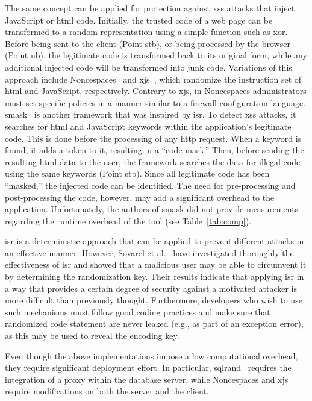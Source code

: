 \documentclass[conference]{IEEEtran}
\begin{document}
The same concept can be applied for protection against
{\sc xss} attacks that inject JavaScript or {\sc html} code.
Initially, the trusted code of a web page can be transformed
to a random representation using a simple function such as {\sc xor}.
Before being sent to the client (Point {\sc s}t{\sc b}),
or being processed by the browser (Point {\sc ub}),
the legitimate code is transformed back to its original form,
while any additional injected code will be transformed into junk code.
Variations of this approach include
Noncespaces~\cite{GC09} and x{\sc js}~\cite{APKLM10}, which
randomize the instruction set of {\sc html} and JavaScript,
respectively. Contrary to x{\sc js}, in Noncespaces administrators
must set specific policies in a manner similar to a firewall
configuration language. {\sc sm}ask~\cite{JB07} is another
framework that was inspired by {\sc isr}. To detect {\sc xss}
attacks, it searches for {\sc html} and
JavaScript keywords within the application's legitimate code. This is
done before the processing of any {\sc http} request. When a keyword is found,
it adds a token to it, resulting in a ``code mask.'' Then, before
sending the resulting {\sc html} data to the user, the framework
searches the data for illegal code using the same keywords (Point
{\sc s}t{\sc b}). Since all legitimate code has been ``masked,'' the injected
code can be identified. The need for 
pre-processing and post-processing the code,
however, may add a significant overhead to the application.
Unfortunately, the authors of {\sc sm}ask did not provide measurements
regarding the runtime overhead of the tool (see
Table~\ref{tab:comp}).

{\sc isr} is a deterministic approach that can be applied to prevent
different attacks in an effective manner. However, Sovarel et
al.~\cite{SEP05} have investigated thoroughly the effectiveness of
{\sc isr} and showed that a malicious user may be able to circumvent
it by determining the randomization key. Their results indicate
that applying {\sc isr} in a way that provides a certain degree of
security against a motivated attacker is more difficult than
previously thought. Furthermore, developers who wish to use such
mechanisms must follow good coding practices and make sure that
randomized code statement are never leaked
(e.g., as part of an exception error),
as this may be used to reveal the encoding key.

Even though the above implementations impose a low computational
overhead, they require significant deployment effort. In particular,
{\sc sql}rand~\cite{BK04} requires the integration of
a proxy within the database
server, while Noncespaces and x{\sc js}~\cite{APKLM10}
require modifications on both the server and the client.
\end{document}
